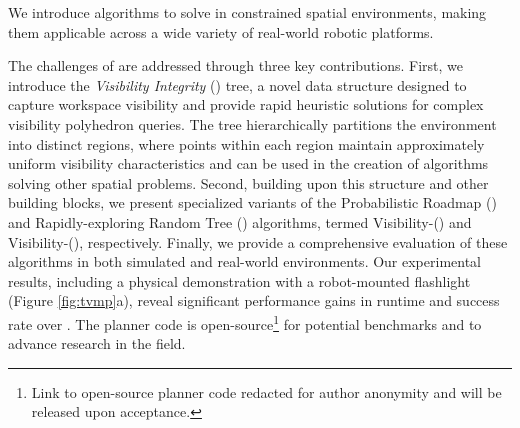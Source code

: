  We introduce \sbmp algorithms to solve \tvmp in constrained spatial environments, making them applicable across a wide variety of real-world robotic platforms. 

The challenges of \vistamp are addressed through three key contributions. First, we introduce the \emph{Visibility Integrity} (\vi) tree, a novel data structure designed to capture workspace visibility and provide rapid heuristic solutions for complex visibility polyhedron queries. The tree hierarchically partitions the environment into distinct regions, where points within each region maintain approximately uniform visibility characteristics and can be used in the creation of algorithms solving other spatial \vistamp problems. Second, building upon this structure and other building blocks, we present specialized variants of the Probabilistic Roadmap (\prm) \cite{kslo-prpp-96} and Rapidly-exploring Random Tree (\rrt) \cite{l-rrtnt-98} algorithms, termed Visibility-\prm (\visprm) and Visibility-\rrt (\visrrt), respectively. Finally, we provide a comprehensive evaluation of these algorithms in both simulated and real-world environments. Our experimental results, including a physical demonstration with a robot-mounted flashlight (Figure \ref{fig:tvmp}a), reveal significant performance gains in runtime and success rate over . The planner code is open-source\footnote{Link to open-source planner code redacted for author anonymity and will be released upon acceptance.} for potential benchmarks and to advance research in the field.


